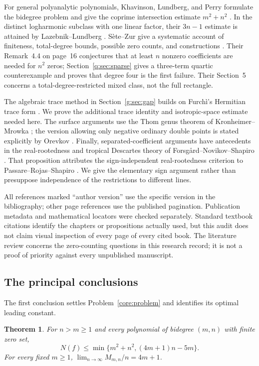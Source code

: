 \documentclass[UTF8,11pt]{ctexart}
\newtheorem{thm}{Theorem}[section]
\theoremstyle{definition}
\numberwithin{equation}{section}
\begin{document}
For general polyanalytic polynomials, Khavinson, Lundberg, and Perry formulate the bidegree problem and give the coprime intersection estimate $m^2+n^2$ \cite[Problem~1.9 and Proposition~1.10, \av, pp.~3--4]{KLP24}. In the distinct logharmonic subclass with one linear factor, their $3n-1$ estimate is attained by Lazebnik--Lundberg \cite[Theorem~1.3, \av, p.~2]{LL26}. S\`ete--Zur give a systematic account of finiteness, total-degree bounds, possible zero counts, and constructions \cite[Theorems~2.7, 2.12, 2.16 and 4.1, pp.~5--8, 12--14]{SZ24}. Their Remark~4.4 on page~16 conjectures that at least $n$ nonzero coefficients are needed for $n^2$ zeros; Section~\ref{q:sec:sparse} gives a three-term quartic counterexample and proves that degree four is the first failure. Their Section~5 concerns a total-degree-restricted mixed class, not the full rectangle.

The algebraic trace method in Section~\ref{g:sec:gap} builds on Furch\`i's Hermitian trace form \cite[Theorem~3.13, Corollary~3.14, and Lemma~4.3, \av, pp.~9--10, 16--17]{Fur25}. We prove the additional trace identity and isotropic-space estimate needed here. The surface arguments use the Thom genus theorem of Kronheimer--Mrowka \cite[Theorem~1, \av, p.~1]{KM94}; the version allowing only negative ordinary double points is stated explicitly by Orevkov \cite[Theorem~3.1, \av, p.~8]{Ore24}. Finally, separated-coefficient arguments have antecedents in the real-rootedness and tropical Descartes theory of Forsg{\aa}rd--Novikov--Shapiro \cite[Proposition~1 and Section~2, author proof, pp.~2, 4]{FNS17}. That proposition attributes the sign-independent real-rootedness criterion to
Passare--Rojas--Shapiro \cite[Definition~1 and Theorem~1, \av, p.~2]{PRS11}.
We give the elementary sign argument rather than presuppose independence of
the restrictions to different lines.

All references marked ``author version'' use the specific version in the bibliography; other page references use the published pagination. Publication metadata and mathematical locators were checked separately. Standard textbook citations identify the chapters or propositions actually used, but this audit does not claim visual inspection of every page of every cited book. The literature review concerns the zero-counting questions in this research record; it is not a proof of priority against every unpublished manuscript.

\subsection{The principal conclusions}\label{sec:overview}
The first conclusion settles Problem~\ref{core:problem} and identifies its optimal leading constant.
\begin{thm}\label{b:thm:main}
For $n>m\ge1$ and every polynomial of bidegree $(m,n)$ with finite zero set,
\begin{equation}\label{b:eq:mainbound}
 N(f)\le\min\{m^2+n^2,(4m+1)n-5m\}.
\end{equation}
For every fixed $m\ge1$, $\lim_{n\to\infty}M_{m,n}/n=4m+1$.
\end{thm}
\end{document}
